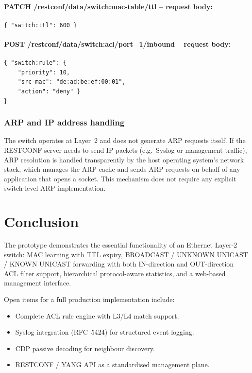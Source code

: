 \documentclass[12pt,a4paper]{article}
\begin{document}
\paragraph{PATCH /restconf/data/switch:mac-table/ttl -- request body:}

\begin{verbatim}
{ "switch:ttl": 600 }
\end{verbatim}

\paragraph{POST /restconf/data/switch:acl/port=1/inbound -- request body:}

\begin{verbatim}
{ "switch:rule": {
    "priority": 10,
    "src-mac": "de:ad:be:ef:00:01",
    "action": "deny" }
}
\end{verbatim}

\subsubsection{ARP and IP address handling}

The switch operates at Layer~2 and does not generate ARP requests itself.
If the RESTCONF server needs to send IP packets (e.g.\ Syslog or management
traffic), ARP resolution is handled transparently by the host operating system's
network stack, which manages the ARP cache and sends ARP requests on behalf of
any application that opens a socket.  This mechanism does not require any
explicit switch-level ARP implementation.

\section*{Conclusion}

The prototype demonstrates the essential functionality of an Ethernet Layer-2
switch: MAC learning with TTL expiry, BROADCAST / UNKNOWN UNICAST / KNOWN
UNICAST forwarding with both IN-direction and OUT-direction ACL filter support,
hierarchical protocol-aware statistics, and a web-based management interface.

Open items for a full production implementation include:

\begin{itemize}[noitemsep]
  \item Complete ACL rule engine with L3/L4 match support.
  \item Syslog integration (RFC~5424) for structured event logging.
  \item CDP passive decoding for neighbour discovery.
  \item RESTCONF / YANG API as a standardised management plane.
\end{itemize}
\end{document}
